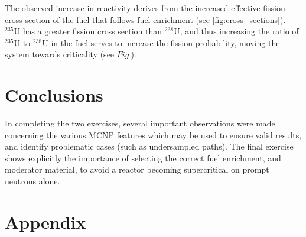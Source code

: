 \documentclass{article}
\begin{document}
    The observed increase in reactivity derives from the increased effective fission cross section of the fuel that follows fuel enrichment (see \ref{fig:cross_sections}). $^{235}\text{U}$ has a greater fission cross section than $^{238}\text{U}$, and thus increasing the ratio of $^{235}\text{U}$ to $^{238}\text{U}$ in the fuel serves to increase the fission probability, moving the system towards criticality (see $Fig~$).

\section{Conclusions}
  In completing the two exercises, several important observations were made concerning the various MCNP features which may be used to ensure valid results, and identify problematic cases (such as undersampled paths). The final exercise shows explicitly the importance of selecting the correct fuel enrichment, and moderator material, to avoid a reactor becoming supercritical on prompt neutrons alone.


\section{Appendix}
    \inputminted{lexer.py -x}{mcnp/1.ip}

    \inputminted{lexer.py -x}{mcnp/3.d.2.ip}
\end{document}
